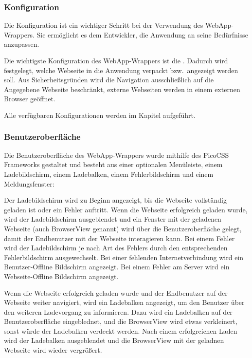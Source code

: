 \newpage

\subsubsection{Konfiguration}

Die Konfiguration ist ein wichtiger Schritt bei der Verwendung des WebApp-Wrappers.
Sie ermöglicht es dem Entwickler, die Anwendung an seine Bedürfnisse anzupassen.

Die wichtigste Konfiguration des WebApp-Wrappers ist die .
Dadurch wird festgelegt, welche Webseite in die Anwendung verpackt bzw.\ angezeigt werden soll.
Aus Sicherheitsgründen wird die Navigation ausschließlich auf die Angegebene Webseite beschränkt, externe Webseiten werden in einem externen Browser geöffnet.

Alle verfügbaren Konfigurationen werden im Kapitel  aufgeführt.

\subsubsection{Benutzeroberfläche}

Die Benutzeroberfläche des WebApp-Wrappers wurde mithilfe des PicoCSS Frameworks gestaltet und besteht aus einer optionalen Menüleiste, einem Ladebildschirm, einem Ladebalken, einem Fehlerbildschirm und einem Meldungsfenster:

Der Ladebildschirm wird zu Beginn angezeigt, bis die Webseite vollständig geladen ist oder ein Fehler auftritt.
Wenn die Webseite erfolgreich geladen wurde, wird der Ladebildschirm ausgeblendet und ein Fenster mit der geladenen Webseite (auch BrowserView genannt) wird über die Benutzeroberfläche gelegt, damit der Endbenutzer mit der Webseite interagieren kann.
Bei einem Fehler wird der Ladebildschirm je nach Art des Fehlers durch den entsprechenden Fehlerbildschirm ausgewechselt.
Bei einer fehlenden Internetverbindung wird ein Benutzer-Offline Bildschirm angezeigt.
Bei einem Fehler am Server wird ein Webseite-Offline Bildschirm angezeigt.

Wenn die Webseite erfolgreich geladen wurde und der Endbenutzer auf der Webseite weiter navigiert, wird ein Ladebalken angezeigt, um den Benutzer über den weiteren Ladevorgang zu informieren.
Dazu wird ein Ladebalken auf der Benutzeroberfläche eingeblednet, und die BrowserView wird etwas verkleinert, sonst würde der Ladebalken verdeckt werden.
Nach einem erfolgreichen Laden wird der Ladebalken ausgeblendet und die BrowserView mit der geladnen Webseite wird wieder vergrößert.


